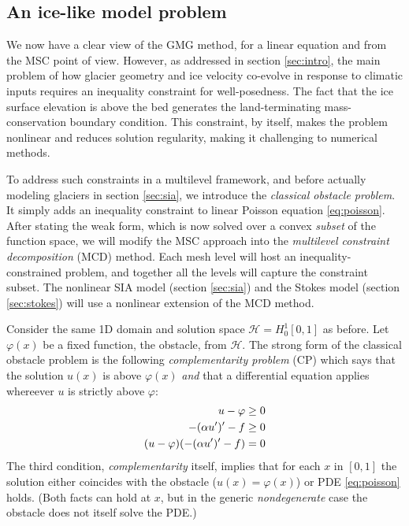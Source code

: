 \documentclass[letterpaper,final,12pt,reqno]{amsart}
\theoremstyle{claim}
\numberwithin{equation}{section}
\numberwithin{figure}{section}
\numberwithin{table}{section}
\numberwithin{theorem}{section}
\begin{document}
\subsection{An ice-like model problem} \label{subsec:obstacleproblem}  We now have a clear view of the GMG method, for a linear equation and from the MSC point of view.  However, as addressed in section \ref{sec:intro}, the main problem of how glacier geometry and ice velocity co-evolve in response to climatic inputs requires an inequality constraint for well-posedness.  The fact that the ice surface elevation is above the bed generates the land-terminating mass-conservation boundary condition.  This constraint, by itself, makes the problem nonlinear and reduces solution regularity, making it challenging to numerical methods.

To address such constraints in a multilevel framework, and before actually modeling glaciers in section \ref{sec:sia}, we introduce the \emph{classical obstacle problem}.  It simply adds an inequality constraint to linear Poisson equation \eqref{eq:poisson}.  After stating the weak form, which is now solved over a convex \emph{subset} of the function space, we will modify the MSC approach into the \emph{multilevel constraint decomposition} (MCD) method.  Each mesh level will host an inequality-constrained problem, and together all the levels will capture the constraint subset.  The nonlinear SIA model (section \ref{sec:sia}) and the Stokes model (section \ref{sec:stokes}) will use a nonlinear extension of the MCD method.

Consider the same 1D domain and solution space $\mathcal{H}=H_0^1[0,1]$ as before.  Let $\varphi(x)$ be a fixed function, the obstacle, from $\mathcal{H}$.  The strong form of the classical obstacle problem is the following \emph{complementarity problem} (CP) \cite{Bueler2021,KinderlehrerStampacchia1980} which says that the solution $u(x)$ is above $\varphi(x)$ \emph{and} that a differential equation applies whereever $u$ is strictly above $\varphi$:
\begin{align}
  u - \varphi &\ge 0 \label{eq:obstaclecp} \\
  -(\alpha u')'-f &\ge 0 \notag \\
  (u-\varphi)(-(\alpha u')'-f) &= 0 \notag
\end{align}
The third condition, \emph{complementarity} itself, implies that for each $x$ in $[0,1]$ the solution either coincides with the obstacle ($u(x)=\varphi(x)$) or PDE \eqref{eq:poisson} holds.  (Both facts can hold at $x$, but in the generic \emph{nondegenerate} \cite{KinderlehrerStampacchia1980} case the obstacle does not itself solve the PDE.)
\end{document}
